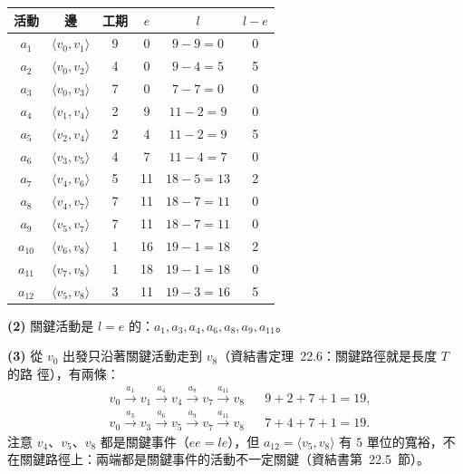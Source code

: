 \begin{pastsoln}
\begin{center}
\small
\begin{tabular}{cccccc}
\toprule
活動 & 邊 & 工期 & $e$ & $l$ & $l - e$ \\
\midrule
$a_1$ & $\langle v_0, v_1 \rangle$ & 9 & 0 & $9 - 9 = 0$ & 0 \\
$a_2$ & $\langle v_0, v_2 \rangle$ & 4 & 0 & $9 - 4 = 5$ & 5 \\
$a_3$ & $\langle v_0, v_3 \rangle$ & 7 & 0 & $7 - 7 = 0$ & 0 \\
$a_4$ & $\langle v_1, v_4 \rangle$ & 2 & 9 & $11 - 2 = 9$ & 0 \\
$a_5$ & $\langle v_2, v_4 \rangle$ & 2 & 4 & $11 - 2 = 9$ & 5 \\
$a_6$ & $\langle v_3, v_5 \rangle$ & 4 & 7 & $11 - 4 = 7$ & 0 \\
$a_7$ & $\langle v_4, v_6 \rangle$ & 5 & 11 & $18 - 5 = 13$ & 2 \\
$a_8$ & $\langle v_4, v_7 \rangle$ & 7 & 11 & $18 - 7 = 11$ & 0 \\
$a_9$ & $\langle v_5, v_7 \rangle$ & 7 & 11 & $18 - 7 = 11$ & 0 \\
$a_{10}$ & $\langle v_6, v_8 \rangle$ & 1 & 16 & $19 - 1 = 18$ & 2 \\
$a_{11}$ & $\langle v_7, v_8 \rangle$ & 1 & 18 & $19 - 1 = 18$ & 0 \\
$a_{12}$ & $\langle v_5, v_8 \rangle$ & 3 & 11 & $19 - 3 = 16$ & 5 \\
\bottomrule
\end{tabular}
\end{center}

\textbf{(2)} 關鍵活動是 $l = e$ 的：$a_1, a_3, a_4, a_6, a_8, a_9, a_{11}$。

\textbf{(3)} 從 $v_0$ 出發只沿著關鍵活動走到 $v_8$（資結書定理~22.6：關鍵路徑就是長度 $T$ 的路
徑），有兩條：
\begin{align*}
&v_0 \xrightarrow{a_1} v_1 \xrightarrow{a_4} v_4 \xrightarrow{a_8} v_7 \xrightarrow{a_{11}} v_8
&& 9 + 2 + 7 + 1 = 19, \\
&v_0 \xrightarrow{a_3} v_3 \xrightarrow{a_6} v_5 \xrightarrow{a_9} v_7 \xrightarrow{a_{11}} v_8
&& 7 + 4 + 7 + 1 = 19.
\end{align*}
注意 $v_4$、$v_5$、$v_8$ 都是關鍵事件（$\mathit{ee} = \mathit{le}$），但 $a_{12} = \langle v_5, v_8 \rangle$ 有
$5$ 單位的寬裕，不在關鍵路徑上：兩端都是關鍵事件的活動不一定關鍵（資結書第~22.5~節）。
\end{pastsoln}
